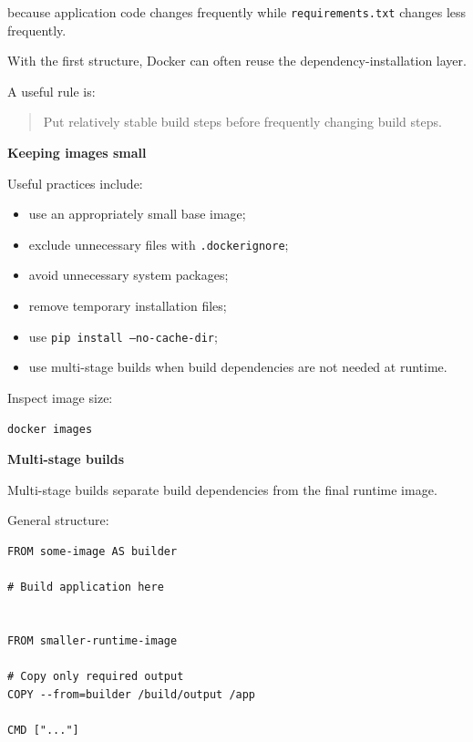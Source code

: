 \documentclass[11pt,letterpaper]{article}
\begin{document}
because application code changes frequently while
\texttt{requirements.txt} changes less frequently.

With the first structure, Docker can often reuse the dependency-installation
layer.

A useful rule is:

\begin{quote}
Put relatively stable build steps before frequently changing build steps.
\end{quote}



\textbf{Keeping images small}

Useful practices include:

\begin{itemize}[leftmargin=*]
    \item use an appropriately small base image;
    \item exclude unnecessary files with \texttt{.dockerignore};
    \item avoid unnecessary system packages;
    \item remove temporary installation files;
    \item use \texttt{pip install --no-cache-dir};
    \item use multi-stage builds when build dependencies are not needed at runtime.
\end{itemize}

Inspect image size:

\begin{lstlisting}
docker images
\end{lstlisting}



\textbf{Multi-stage builds}

Multi-stage builds separate build dependencies from the final runtime image.

General structure:

\begin{lstlisting}
FROM some-image AS builder

# Build application here


FROM smaller-runtime-image

# Copy only required output
COPY --from=builder /build/output /app

CMD ["..."]
\end{lstlisting}
\end{document}
